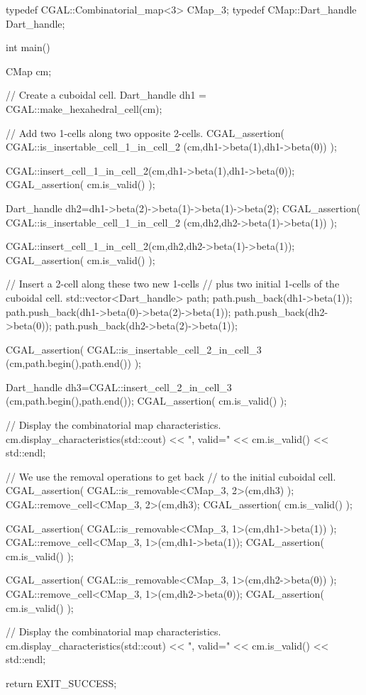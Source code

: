 \begin{ccExampleCode}
typedef CGAL::Combinatorial_map<3> CMap_3;
typedef CMap::Dart_handle          Dart_handle;

int main()
{
  CMap cm;

  // Create a cuboidal cell.
  Dart_handle dh1 = CGAL::make_hexahedral_cell(cm);

  // Add two 1-cells along two opposite 2-cells.
  CGAL_assertion( CGAL::is_insertable_cell_1_in_cell_2
                        (cm,dh1->beta(1),dh1->beta(0)) );

  CGAL::insert_cell_1_in_cell_2(cm,dh1->beta(1),dh1->beta(0));
  CGAL_assertion( cm.is_valid() );

  Dart_handle dh2=dh1->beta(2)->beta(1)->beta(1)->beta(2);
  CGAL_assertion( CGAL::is_insertable_cell_1_in_cell_2
                        (cm,dh2,dh2->beta(1)->beta(1)) );

  CGAL::insert_cell_1_in_cell_2(cm,dh2,dh2->beta(1)->beta(1));
  CGAL_assertion( cm.is_valid() );

  // Insert a 2-cell along these two new 1-cells 
  // plus two initial 1-cells of the cuboidal cell.
  std::vector<Dart_handle> path;
  path.push_back(dh1->beta(1));
  path.push_back(dh1->beta(0)->beta(2)->beta(1));
  path.push_back(dh2->beta(0));
  path.push_back(dh2->beta(2)->beta(1));

  CGAL_assertion( CGAL::is_insertable_cell_2_in_cell_3
                        (cm,path.begin(),path.end()) );
  
  Dart_handle dh3=CGAL::insert_cell_2_in_cell_3
                        (cm,path.begin(),path.end());
  CGAL_assertion( cm.is_valid() );
  
  // Display the combinatorial map characteristics.
  cm.display_characteristics(std::cout) 
       << ", valid=" << cm.is_valid() << std::endl;

  // We use the removal operations to get back 
  // to the initial cuboidal cell.
  CGAL_assertion( CGAL::is_removable<CMap_3, 2>(cm,dh3) );
  CGAL::remove_cell<CMap_3, 2>(cm,dh3);
  CGAL_assertion( cm.is_valid() );

  CGAL_assertion( CGAL::is_removable<CMap_3, 1>(cm,dh1->beta(1)) );
  CGAL::remove_cell<CMap_3, 1>(cm,dh1->beta(1));
  CGAL_assertion( cm.is_valid() );

  CGAL_assertion( CGAL::is_removable<CMap_3, 1>(cm,dh2->beta(0)) );
  CGAL::remove_cell<CMap_3, 1>(cm,dh2->beta(0));
  CGAL_assertion( cm.is_valid() );
  
  // Display the combinatorial map characteristics.
  cm.display_characteristics(std::cout) 
        << ", valid=" << cm.is_valid() << std::endl;

  return EXIT_SUCCESS;
}
\end{ccExampleCode}

